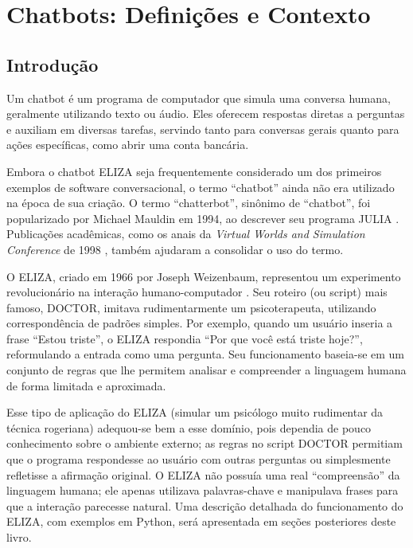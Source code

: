 \documentclass[14pt,a4paper,oneside]{book}
\begin{document}
\newpage

\tableofcontents
\newpage

\chapter{Chatbots: Definições e Contexto}

\section{Introdução}

Um chatbot é um programa de computador que simula uma conversa humana, geralmente utilizando texto ou áudio. Eles oferecem respostas diretas a perguntas e auxiliam em diversas tarefas, servindo tanto para conversas gerais quanto para ações específicas, como abrir uma conta bancária.

Embora o chatbot ELIZA \cite{Weizenbaum1996} seja frequentemente considerado um dos primeiros exemplos de software conversacional, o termo ``chatbot'' ainda não era utilizado na época de sua criação. 
O termo ``chatterbot'', sinônimo de ``chatbot'', foi popularizado por Michael Mauldin em 1994, ao descrever seu programa JULIA \cite{Mauldin1994}. 
Publicações acadêmicas, como os anais da \textit{Virtual Worlds and Simulation Conference} de 1998 \cite{Jacobstein1998}, também ajudaram a consolidar o uso do termo.

O ELIZA, criado em 1966 por Joseph Weizenbaum,  representou um experimento revolucionário na interação humano-computador \cite{Weizenbaum1996}. Seu roteiro (ou script)  mais famoso, DOCTOR, imitava rudimentarmente um psicoterapeuta, utilizando correspondência de padrões simples. Por exemplo, quando um usuário inseria a frase “Estou triste”, o ELIZA respondia “Por que você está triste hoje?”, reformulando a entrada como uma pergunta. Seu funcionamento baseia-se em um conjunto de regras que lhe permitem analisar e compreender a linguagem humana de forma limitada e aproximada. 

Esse tipo de aplicação do ELIZA (simular um psicólogo muito rudimentar da técnica rogeriana) adequou-se bem a esse domínio, pois dependia de pouco conhecimento sobre o ambiente externo; as regras no script DOCTOR permitiam que o programa respondesse ao usuário com outras perguntas ou simplesmente refletisse a afirmação original. O ELIZA não possuía uma real ``compreensão'' da linguagem humana; ele apenas utilizava palavras-chave e manipulava frases para que a interação parecesse natural. Uma descrição detalhada do funcionamento do ELIZA, com exemplos em Python, será apresentada em seções posteriores deste livro.
\end{document}

